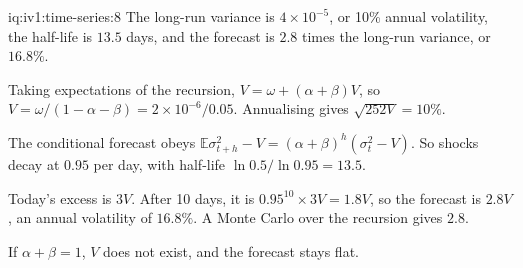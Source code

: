 \begin{solution}{iq:iv1:time-series:8}
The long-run variance is $4 \times 10^{-5}$, or 10\% annual volatility, the half-life is $13.5$ days, and the forecast is $2.8$ times the long-run variance, or $16.8\%$.

Taking expectations of the recursion, $V = \omega + (\alpha + \beta)V$, so $V = \omega/(1 - \alpha - \beta) = 2 \times 10^{-6}/0.05$. Annualising gives $\sqrt{252V} = 10\%$.

The conditional forecast obeys $\mathbb{E}\sigma_{t + h}^2 - V = (\alpha + \beta)^h(\sigma_t^2 - V)$. So shocks decay at $0.95$ per day, with half-life $\ln 0.5/\ln 0.95 = 13.5$.

Today's excess is $3V$. After 10 days, it is $0.95^{10} \times 3V = 1.8V$, so the forecast is $2.8V$, an annual volatility of $16.8\%$. A Monte Carlo over the recursion gives $2.8$.

If $\alpha + \beta = 1$, $V$ does not exist, and the forecast stays flat.



\end{solution}

